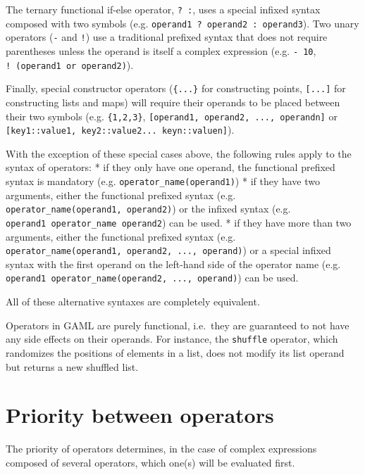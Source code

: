 \documentclass[]{book}
\theoremstyle{definition}
\theoremstyle{definition}
\theoremstyle{definition}
\theoremstyle{remark}
\begin{document}
The ternary functional if-else operator, \texttt{?\ :}, uses a special
infixed syntax composed with two symbols (e.g.
\texttt{operand1\ ?\ operand2\ :\ operand3}). Two unary operators
(\texttt{-} and \texttt{!}) use a traditional prefixed syntax that does
not require parentheses unless the operand is itself a complex
expression (e.g. \texttt{-\ 10}, \texttt{!\ (operand1\ or\ operand2)}).

Finally, special constructor operators (\texttt{\{...\}} for
constructing points, \texttt{{[}...{]}} for constructing lists and maps)
will require their operands to be placed between their two symbols (e.g.
\texttt{\{1,2,3\}}, \texttt{{[}operand1,\ operand2,\ ...,\ operandn{]}}
or \texttt{{[}key1::value1,\ key2::value2...\ keyn::valuen{]}}).

With the exception of these special cases above, the following rules
apply to the syntax of operators: * if they only have one operand, the
functional prefixed syntax is mandatory (e.g.
\texttt{operator\_name(operand1)}) * if they have two arguments, either
the functional prefixed syntax (e.g.
\texttt{operator\_name(operand1,\ operand2)}) or the infixed syntax
(e.g. \texttt{operand1\ operator\_name\ operand2}) can be used. * if
they have more than two arguments, either the functional prefixed syntax
(e.g. \texttt{operator\_name(operand1,\ operand2,\ ...,\ operand)}) or a
special infixed syntax with the first operand on the left-hand side of
the operator name (e.g.
\texttt{operand1\ operator\_name(operand2,\ ...,\ operand)}) can be
used.

All of these alternative syntaxes are completely equivalent.

Operators in GAML are purely functional, i.e.~they are guaranteed to not
have any side effects on their operands. For instance, the
\texttt{shuffle} operator, which randomizes the positions of elements in
a list, does not modify its list operand but returns a new shuffled
list.

\section{\texorpdfstring{}{ }}\label{section-21}

\section{Priority between operators}\label{priority-between-operators-3}

The priority of operators determines, in the case of complex expressions
composed of several operators, which one(s) will be evaluated first.
\end{document}
